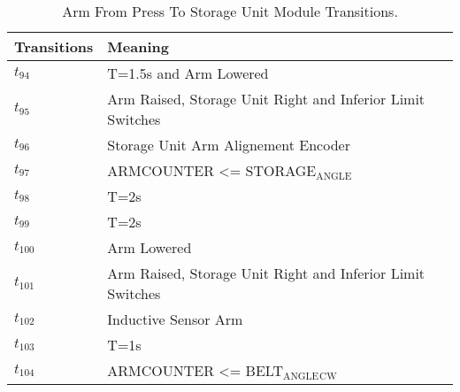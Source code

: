 \begin{table}[H]
\caption{Arm From Press To Storage Unit Module Transitions.}
\centering
\begin{tabular}{M{5cm}M{10cm}}
Transitions & Meaning\\
\hline
\hyperlink{partialNet:tt941}{\hypertarget{partialTable:tt94}{$t_{94}$}} & T=1.5s and Arm Lowered\\
\hyperlink{partialNet:t951}{\hypertarget{partialTable:t95}{$t_{95}$}} & Arm Raised, Storage Unit Right and Inferior Limit Switches\\
\hyperlink{partialNet:t961}{\hypertarget{partialTable:t96}{$t_{96}$}} & Storage Unit Arm Alignement Encoder\\
\hyperlink{partialNet:t971}{\hypertarget{partialTable:t97}{$t_{97}$}} & ARMCOUNTER <= STORAGE\(_{\text{ANGLE}}\)\\
\hyperlink{partialNet:tt981}{\hypertarget{partialTable:tt98}{$t_{98}$}} & T=2s\\
\hyperlink{partialNet:tt991}{\hypertarget{partialTable:tt99}{$t_{99}$}} & T=2s\\
\hyperlink{partialNet:t1001}{\hypertarget{partialTable:t100}{$t_{100}$}} & Arm Lowered\\
\hyperlink{partialNet:t1011}{\hypertarget{partialTable:t101}{$t_{101}$}} & Arm Raised, Storage Unit Right and Inferior Limit Switches\\
\hyperlink{partialNet:t1021}{\hypertarget{partialTable:t102}{$t_{102}$}} & Inductive Sensor Arm\\
\hyperlink{partialNet:tt1031}{\hypertarget{partialTable:tt103}{$t_{103}$}} & T=1s\\
\hyperlink{partialNet:t1041}{\hypertarget{partialTable:t104}{$t_{104}$}} & ARMCOUNTER <= BELT\(_{\text{ANGLE}}\)\(_{\text{CW}}\)\\
\end{tabular}
\end{table}
